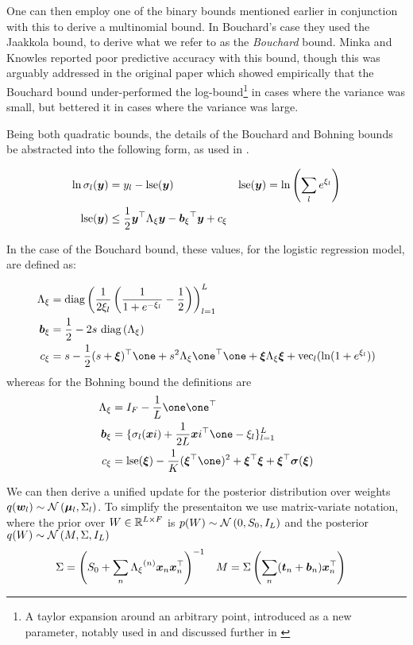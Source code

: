 One can then employ one of the binary bounds mentioned earlier in conjunction with this to derive a multinomial bound. In Bouchard's case they used the Jaakkola bound, to derive what we refer to as the \emph{Bouchard} bound. Minka and Knowles reported poor predictive accuracy with this bound\cite{MinkaKnowles}, though this was arguably addressed in the original paper which showed empirically that the Bouchard bound under-performed the log-bound\footnote{A taylor expansion around an arbitrary point, introduced as a new parameter, notably used in\cite{Blei2006} and discussed further in \cite{Wang2013a}} in cases where the variance was small, but bettered it in cases where the variance was large.

Being both quadratic bounds, the details of the Bouchard and Bohning bounds be abstracted into the following form, as used in \cite{Khan2010}.

\begin{align}
\ln \sigma_l(\bm y) & = y_l - \text{lse} (\bm y) & \text{lse} (\bm y) & = \ln \left(\sum_l e^{\xi_l} \right)\\
\text{lse}(\bm y) & \leq \frac{1}{2} \bm y^\top { \Lambda_{\xi} } \bm y - { \bm b_{\xi} }^\top\bm y + { c_{\xi} }
\end{align}

In the case of the Bouchard bound, these values, for the logistic regression model, are defined as:

\begin{align}
\Axi & = \diag{\frac{1}{2\xi_l} \left( \frac{1}{1 + e^{-\xi_l}} - \half\right) }_{l=1}^L  \\
\bxi & = \half - 2 s \text{ }\diag{\Axi} \\
\cxi & = s - \half (s + \vv{\xi})\T\one + s^2\Axi \one\T\one + \vv{\xi}\Axi\vv{\xi} + \text{vec}_l(\ln (1 + e^{\xi_l}))
\end{align}
whereas for the Bohning bound the definitions are
\begin{align}
\Axi & = I_F - \frac{1}{L} \one \one \T \\
\bxi & = \{ \sigma_l(\vv{xi}) + \frac{1}{2L} \vv{xi}\T\one - \xi_l \}_{l=1}^{L} \\
\cxi & = \lse(\vv{\xi}) - \frac{1}{K}(\vv{\xi}\T\one)^2 + \vv{\xi}\T\vv{\xi} + \vv{\xi}\T\vv{\sigma}(\vv{\xi})
\end{align}

We can then derive a unified update for the posterior distribution over weights $q(\bm w_l) \sim \mathcal{N} \left( {\bm \mu_l}, {\Sigma_l} \right)$. To simplify the presentaiton we use matrix-variate notation, where the prior over $W \in { \mathbb{R}^{L \times F} }$ is $p(W) \sim \mathcal{N} \left(0, S_0, I_L\right)$ and the posterior $q(W) \sim \mathcal{N} \left(M, \Sigma, I_L\right)$
\begin{align}
\Sigma &= {\left( S_0 + \sum_n { \Lambda_{\xi} }^{(n)}\bm x_n\bm x_n^\top \right)}^{-1} & M &= \Sigma \left(\sum_n (\bm t_n + \bm b_n)\bm x_n^\top\right)
\end{align}


